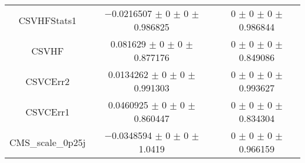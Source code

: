 \begin{table}
\begin{tabular}{ccc}
CSVHFStats1 	& \num{-0.0216507} $\pm$ \num{0} $\pm$ \num{0} $\pm$ \num{0.986825} 	& \num{0} $\pm$ \num{0} $\pm$ \num{0} $\pm$ \num{0.986844}\\
CSVHF 	& \num{0.081629} $\pm$ \num{0} $\pm$ \num{0} $\pm$ \num{0.877176} 	& \num{0} $\pm$ \num{0} $\pm$ \num{0} $\pm$ \num{0.849086}\\
CSVCErr2 	& \num{0.0134262} $\pm$ \num{0} $\pm$ \num{0} $\pm$ \num{0.991303} 	& \num{0} $\pm$ \num{0} $\pm$ \num{0} $\pm$ \num{0.993627}\\
CSVCErr1 	& \num{0.0460925} $\pm$ \num{0} $\pm$ \num{0} $\pm$ \num{0.860447} 	& \num{0} $\pm$ \num{0} $\pm$ \num{0} $\pm$ \num{0.834304}\\
CMS\_scale\_0p25j 	& \num{-0.0348594} $\pm$ \num{0} $\pm$ \num{0} $\pm$ \num{1.0419} 	& \num{0} $\pm$ \num{0} $\pm$ \num{0} $\pm$ \num{0.966159}\\
\bottomrule
\end{tabular}
\end{table}